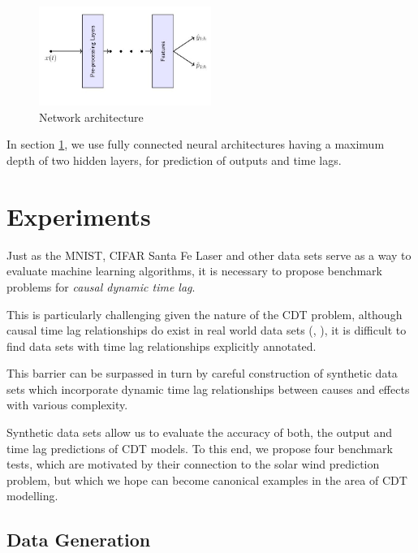 \documentclass[twoside]{article}
\begin{document}
\begin{figure}[h]
\vspace{.3in}
\centerline{\includegraphics[width=0.5\textwidth]{figures/network.jpg}}
\vspace{.3in}
\caption{Network architecture}
\label{fig:network}
\end{figure}


In section \ref{sec:exp}, we use fully connected neural architectures having a maximum depth of two hidden layers, for prediction of outputs and time lags.

\section{Experiments}\label{sec:exp}


Just as the MNIST, CIFAR Santa Fe Laser and other data sets serve as a way to evaluate machine learning algorithms, it is necessary to propose benchmark problems for \emph{causal dynamic time lag}.

This is particularly challenging given the nature of the CDT problem, although causal time lag
relationships do exist in real world data sets (\cite{doi:10.1002/jgra.50429}, \cite{ZHOU2006195}), it is difficult to find data sets with time lag relationships explicitly annotated.

This barrier can be surpassed in turn by careful construction of synthetic data sets which incorporate dynamic time lag relationships between causes and effects with various complexity.

Synthetic data sets allow us to evaluate the accuracy of both, the output and time lag predictions of CDT models. To this end, we propose four benchmark tests, which are motivated by their connection to the solar wind prediction problem, but which we hope can become canonical examples in the area of CDT modelling.

\subsection{Data Generation}
\end{document}

